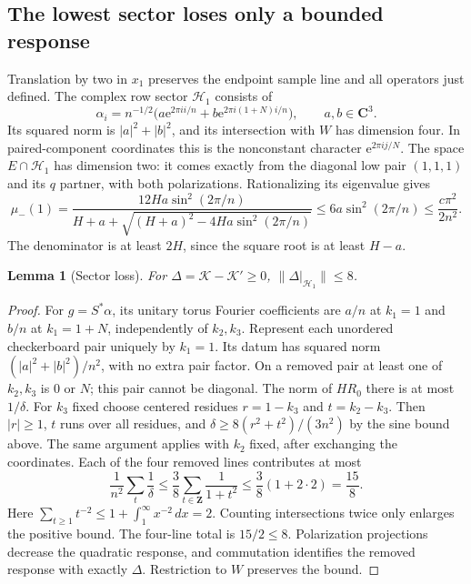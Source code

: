 \documentclass[11pt]{article}
\newcommand{\C}{\mathbf C}
\newcommand{\Z}{\mathbf Z}
\newcommand{\norm}[1]{\lVert#1\rVert}
\newcommand{\e}{\mathrm e}
\newtheorem{lemma}[theorem]{Lemma}
\theoremstyle{definition}
\theoremstyle{remark}
\begin{document}
\subsection{The lowest sector loses only a bounded response}
Translation by two in $x_1$ preserves the endpoint sample line and all
operators just defined. The complex row sector $\mathcal H_1$ consists of
\[
 \alpha_i=n^{-1/2}\bigl(a\e^{2\pi i i/n}
                  +b\e^{2\pi i(1+N)i/n}\bigr),\qquad a,b\in\C^3.
\]
Its squared norm is $|a|^2+|b|^2$, and its intersection with $W$ has
dimension four. In paired-component coordinates this is the nonconstant
character $\e^{2\pi i j/N}$. The space $E\cap\mathcal H_1$ has dimension
two: it comes exactly from the diagonal low pair $(1,1,1)$ and its
$q$ partner, with both polarizations. Rationalizing its eigenvalue gives
\begin{equation}\label{eq:lowestenergy}
 \mu_-(1)=\frac{12Ha\sin^2(2\pi/n)}
 {H+a+\sqrt{(H+a)^2-4Ha\sin^2(2\pi/n)}}
 \le6a\sin^2(2\pi/n)\le\frac{c\pi^2}{2n^2}.
\end{equation}
The denominator is at least $2H$, since the square root is at least $H-a$.

\begin{lemma}[Sector loss]\label{lem:sectorloss}
For $\Delta=\mathcal K-\mathcal K'\ge0$,
$\norm{\Delta|_{\mathcal H_1}}\le8$.
\end{lemma}
\begin{proof}
For $g=S^*\alpha$, its unitary torus Fourier coefficients are $a/n$ at
$k_1=1$ and $b/n$ at $k_1=1+N$, independently of $k_2,k_3$.
Represent each unordered checkerboard pair uniquely by $k_1=1$.
Its datum has squared norm $(|a|^2+|b|^2)/n^2$, with no extra pair factor.
On a removed pair at least one of $k_2,k_3$ is $0$ or $N$; this pair
cannot be diagonal. The norm of $HR_0$ there is at most $1/\delta$.
For $k_3$ fixed choose centered residues $r=1-k_3$ and $t=k_2-k_3$.
Then $|r|\ge1$, $t$ runs over all residues, and
$\delta\ge8(r^2+t^2)/(3n^2)$ by the sine bound above. The same argument
applies with $k_2$ fixed, after exchanging the coordinates.
Each of the four removed lines contributes at most
\[
 \frac1{n^2}\sum_t\frac1\delta
 \le\frac38\sum_{t\in\Z}\frac1{1+t^2}
 \le\frac38(1+2\cdot2)=\frac{15}8.
\]
Here $\sum_{t\ge1}t^{-2}\le1+\int_1^\infty x^{-2}\,dx=2$.
Counting intersections twice only enlarges the positive bound.
The four-line total is $15/2\le8$. Polarization projections decrease
the quadratic response, and commutation identifies the removed response
with exactly $\Delta$. Restriction to $W$ preserves the bound.
\end{proof}
\end{document}
